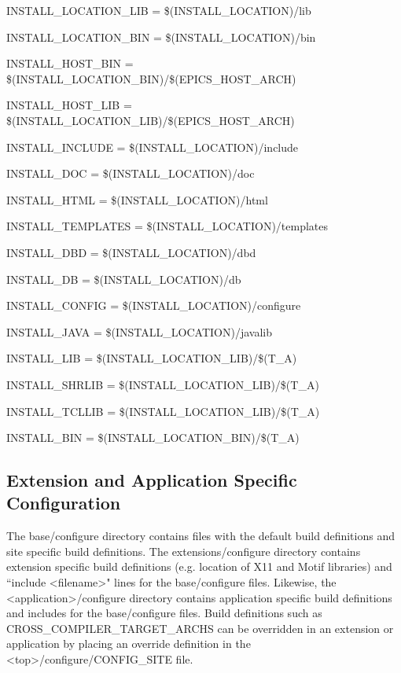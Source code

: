 INSTALL\_LOCATION\_LIB      = \$(INSTALL\_LOCATION)/lib

INSTALL\_LOCATION\_BIN      = \$(INSTALL\_LOCATION)/bin



INSTALL\_HOST\_BIN            = \$(INSTALL\_LOCATION\_BIN)/\$(EPICS\_HOST\_ARCH)

INSTALL\_HOST\_LIB            = \$(INSTALL\_LOCATION\_LIB)/\$(EPICS\_HOST\_ARCH)



INSTALL\_INCLUDE           = \$(INSTALL\_LOCATION)/include

INSTALL\_DOC               = \$(INSTALL\_LOCATION)/doc

INSTALL\_HTML              = \$(INSTALL\_LOCATION)/html

INSTALL\_TEMPLATES         = \$(INSTALL\_LOCATION)/templates

INSTALL\_DBD               = \$(INSTALL\_LOCATION)/dbd

INSTALL\_DB                = \$(INSTALL\_LOCATION)/db

INSTALL\_CONFIG            = \$(INSTALL\_LOCATION)/configure

INSTALL\_JAVA              = \$(INSTALL\_LOCATION)/javalib



INSTALL\_LIB               = \$(INSTALL\_LOCATION\_LIB)/\$(T\_A)

INSTALL\_SHRLIB            = \$(INSTALL\_LOCATION\_LIB)/\$(T\_A)

INSTALL\_TCLLIB            = \$(INSTALL\_LOCATION\_LIB)/\$(T\_A)

INSTALL\_BIN               = \$(INSTALL\_LOCATION\_BIN)/\$(T\_A)

\subsection{Extension and Application Specific Configuration}

The base/configure directory contains files with the default build definitions and site specific build definitions. The 
extensions/configure directory contains extension specific build definitions (e.g. location of X11 and Motif libraries) and 
``include \textless{}filename\textgreater{}" lines for the base/configure files. Likewise, the \textless{}application\textgreater{}/configure directory contains 
application specific build definitions and includes for the base/configure files. Build definitions such as \\ 
CROSS\_COMPILER\_TARGET\_ARCHS can be overridden in an extension or application by placing an override 
definition in the \textless{}top\textgreater{}/configure/CONFIG\_SITE file.

